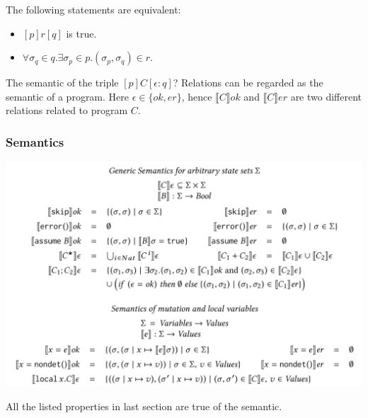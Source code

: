 \documentclass[11pt]{beamer}
\begin{document}
\begin{frame}\frametitle{}

\begin{lemma}[Characterization]
The following statements are equivalent:
\begin{itemize}
\item $[p]r[q]$ is true.
\item $\forall \sigma_q \in q. \exists \sigma_p\in p. (\sigma_p,\sigma_q)\in r$.

\end{itemize}

\end{lemma}

The semantic of the triple $[p]C[\epsilon: q]$? Relations can be regarded as the semantic of a program. Here $\epsilon\in \{ok,er\}$, hence $\llbracket C\rrbracket ok$ and $\llbracket C \rrbracket er$ are two different relations related to program $C$.




\end{frame}

\begin{frame}
\begin{center}\frametitle{Semantics}
\includegraphics[scale = 0.3]{9.PNG}
\begin{theorem}
All the listed properties in last section are true of the semantic.

\end{theorem}
\end{center}
\end{frame}
\end{document}

